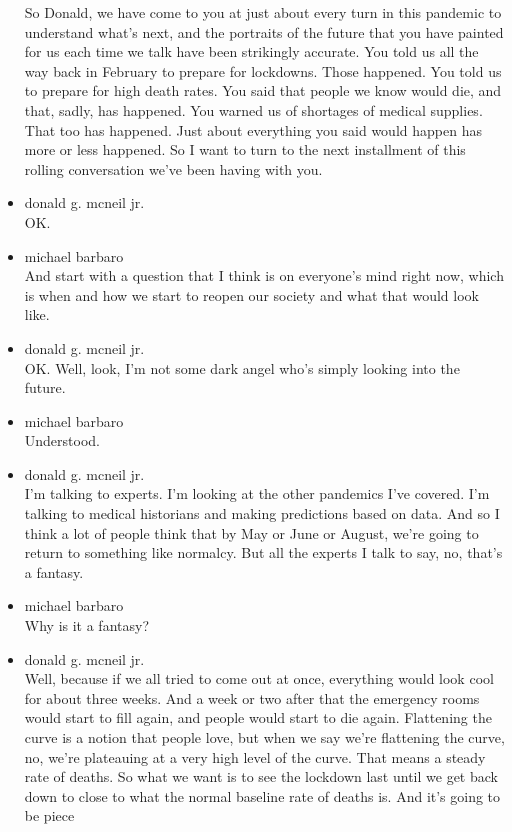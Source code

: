\begin{itemize}
  So Donald, we have come to you at just about every turn in this
  pandemic to understand what's next, and the portraits of the future
  that you have painted for us each time we talk have been strikingly
  accurate. You told us all the way back in February to prepare for
  lockdowns. Those happened. You told us to prepare for high death
  rates. You said that people we know would die, and that, sadly, has
  happened. You warned us of shortages of medical supplies. That too has
  happened. Just about everything you said would happen has more or less
  happened. So I want to turn to the next installment of this rolling
  conversation we've been having with you.
\item
  donald g. mcneil jr.\\
  OK.
\item
  michael barbaro\\
  And start with a question that I think is on everyone's mind right
  now, which is when and how we start to reopen our society and what
  that would look like.
\item
  donald g. mcneil jr.\\
  OK. Well, look, I'm not some dark angel who's simply looking into the
  future.
\item
  michael barbaro\\
  Understood.
\item
  donald g. mcneil jr.\\
  I'm talking to experts. I'm looking at the other pandemics I've
  covered. I'm talking to medical historians and making predictions
  based on data. And so I think a lot of people think that by May or
  June or August, we're going to return to something like normalcy. But
  all the experts I talk to say, no, that's a fantasy.
\item
  michael barbaro\\
  Why is it a fantasy?
\item
  donald g. mcneil jr.\\
  Well, because if we all tried to come out at once, everything would
  look cool for about three weeks. And a week or two after that the
  emergency rooms would start to fill again, and people would start to
  die again. Flattening the curve is a notion that people love, but when
  we say we're flattening the curve, no, we're plateauing at a very high
  level of the curve. That means a steady rate of deaths. So what we
  want is to see the lockdown last until we get back down to close to
  what the normal baseline rate of deaths is. And it's going to be piece

\end{itemize}
